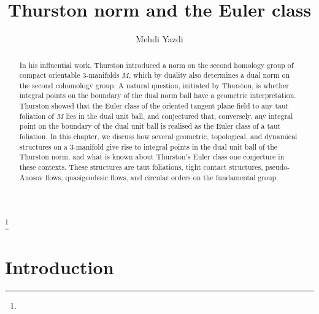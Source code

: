 \documentclass[11pt]{amsart}
\theoremstyle{remark}
\theoremstyle{definition}
\begin{document}
	\title{Thurston norm and the Euler class}
	\author[Mehdi Yazdi]{Mehdi Yazdi}
	\address{Department of Mathematics\\King's College London}
	
	\date{}
	\thanks{}
	
	\begin{abstract}
		In his influential work, Thurston introduced a norm on the second homology group of compact orientable 3-manifolds $M$, which by duality also determines a dual norm on the second cohomology group. A natural question, initiated by Thurston, is whether integral points on the boundary of the dual norm ball have a geometric interpretation. Thurston showed that the Euler class of the oriented tangent plane field to any taut foliation of $M$ lies in the dual unit ball, and conjectured that, conversely, any integral point on the boundary of the dual unit ball is realised as the Euler class of a taut foliation. In this chapter, we discuss how several geometric, topological, and dynamical structures on a 3-manifold give rise to integral points in the dual unit ball of the Thurston norm, and what is known about Thurston's Euler class one conjecture in these contexts. These structures are taut foliations, tight contact structures, pseudo-Anosov flows, quasigeodesic flows, and circular orders on the fundamental group.
	\end{abstract}	
	
	\maketitle

	
	
	\section{Introduction}
	
\end{document}
